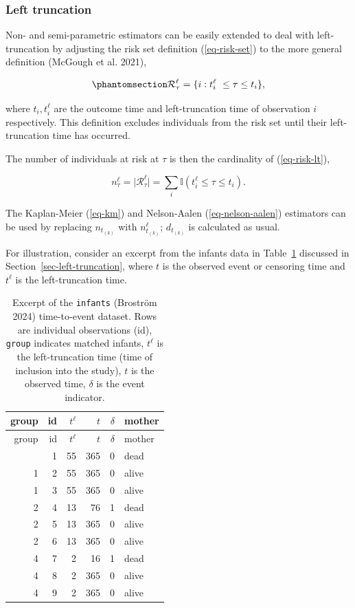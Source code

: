 \documentclass[
  letterpaper,
  krantz2]{style/krantz}
\begin{document}
\subsubsection{Left truncation}\label{sec-non-param-lt}

Non- and semi-parametric estimators can be easily extended to deal with
left-truncation by adjusting the risk
set definition (\ref{eq-risk-set}) to the more general
definition (McGough et al. 2021),

\begin{equation}\phantomsection\label{eq-risk-lt}{
\mathcal{R}_\tau^\ell = \{i: t_i^\ell \ \leq \tau \leq t_i \}, 
}\end{equation}

where \(t_i, t_i^\ell\) are the outcome time and left-truncation time of
observation \(i\) respectively. This definition excludes individuals
from the risk set until their left-truncation time has occurred.

The number of individuals at risk at \(\tau\) is then the cardinality of
(\ref{eq-risk-lt}),

\[
n^\ell_\tau = \vert \mathcal{R}_\tau^\ell \vert = \sum_i \mathbb{I}(t_i^\ell \leq \tau \leq t_i).
\]

The Kaplan-Meier (\ref{eq-km}) and
Nelson-Aalen (\ref{eq-nelson-aalen})
estimators can be used by replacing \(n_{t_{(k)}}\) with
\(n^\ell_{t_{(k)}}\); \(d_{t_{(k)}}\) is calculated as usual.

For illustration, consider an excerpt from the infants data in
Table~\ref{tbl-surv-data-infants} discussed in
Section~\ref{sec-left-truncation}, where \(t\) is the observed event or
censoring time and \(t^\ell\) is the left-truncation time.

\begin{longtable}[]{@{}rrrrrl@{}}
\caption{Excerpt of the \texttt{infants} (Broström 2024) time-to-event
dataset. Rows are individual observations (id), \texttt{group} indicates
matched infants, \(t^\ell\) is the left-truncation time (time of
inclusion into the study), \(t\) is the observed time, \(\delta\) is the
event indicator.}\label{tbl-surv-data-infants}\tabularnewline
\toprule\noalign{}
group & id & \(t^\ell\) & \(t\) & \(\delta\) & mother \\
\midrule\noalign{}
\endfirsthead
\toprule\noalign{}
group & id & \(t^\ell\) & \(t\) & \(\delta\) & mother \\
\midrule\noalign{}
\endhead
\bottomrule\noalign{}
\endlastfoot
1 & 1 & 55 & 365 & 0 & dead \\
1 & 2 & 55 & 365 & 0 & alive \\
1 & 3 & 55 & 365 & 0 & alive \\
2 & 4 & 13 & 76 & 1 & dead \\
2 & 5 & 13 & 365 & 0 & alive \\
2 & 6 & 13 & 365 & 0 & alive \\
4 & 7 & 2 & 16 & 1 & dead \\
4 & 8 & 2 & 365 & 0 & alive \\
4 & 9 & 2 & 365 & 0 & alive \\
\end{longtable}
\end{document}
